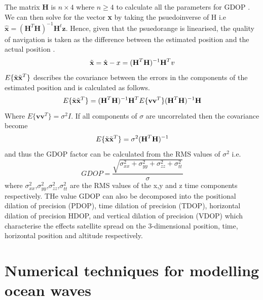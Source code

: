 The matrix \textbf{H} is $n\times4$ where $n \geq 4$ to calculate all the parameters for GDOP \cite{jwo2001efficient}. We can then solve for the vector \textbf{x} by taking the psuedoinverse of H i.e $\hat{\textbf{x}} = (\textbf{H}^T\textbf{H})^{-1}\textbf{H}^t\textbf{z}$. Hence, given that the psuedorange is linearised, the quality of navigation is taken as the difference between the estimated position and the actual position \cite{jwo2001efficient}.
\begin{equation}
	\Tilde{\textbf{x}} = \hat{\textbf{x}} - x = (\textbf{H}^T\textbf{H})^{-1}\textbf{H}^Tv
\end{equation}
$E\{\Tilde{\textbf{x}}\Tilde{\textbf{x}}^T\}$ describes the covariance between the errors in the components of the estimated position \cite{jwo2001efficient} and is calculated as follows. 
\begin{equation}
	E\{\Tilde{\textbf{x}}\Tilde{\textbf{x}}^T\} = (\textbf{H}^T\textbf{H})^{-1}\textbf{H}^TE\{\textbf{vv}^T\} (\textbf{H}^T\textbf{H})^{-1}\textbf{H}
\end{equation}
Where $E\{\textbf{vv}^T\} = \sigma^2 I$. If all components of $\sigma$ are uncorrelated then the covariance become
\begin{equation}
	E\{\Tilde{\textbf{x}}\Tilde{\textbf{x}}^T\} = \sigma^2(\textbf{H}^T\textbf{H})^{-1}
\end{equation}
and thus the GDOP factor can be calculated from the RMS values of $\sigma^2$ i.e.
\begin{equation}
	GDOP = \frac{\sqrt{\sigma_{xx}^2+\sigma_{yy}^2+ \sigma_{zz}^2+\sigma_{tt}^2}}{\sigma}
\end{equation} where $\sigma_{xx}^2$,$\sigma_{yy}^2$,$\sigma_{zz}^2$,$\sigma_{tt}^2$ are the RMS values of the x,y and z time components respectively. THe value GDOP can also be decomposed into the positional dilation of precision (PDOP), time dilation of precision (TDOP), horizontal dilation of precision HDOP, and vertical dilation of precision (VDOP) which characterise the effects satellite spread on the 3-dimensional position, time, horizontal position and altitude respectively.\par

\section{Numerical techniques for modelling ocean waves}

